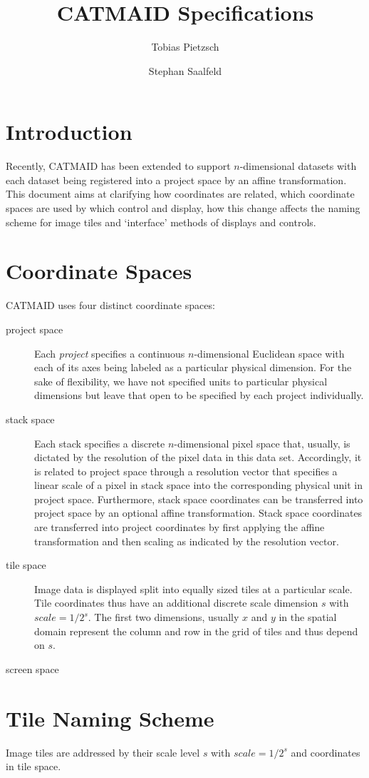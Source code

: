 \documentclass[a4paper,10pt]{article}
\title{CATMAID Specifications}
\author{Tobias Pietzsch \and Stephan Saalfeld}
\begin{document}
\maketitle


\section{Introduction}

Recently, CATMAID has been extended to support $n$-dimensional datasets with each dataset being registered into a project space by an affine transformation.  This document aims at clarifying how coordinates are related, which coordinate spaces are used by which control and display, how this change affects the naming scheme for image tiles and `interface' methods of displays and controls.


\section{Coordinate Spaces}

CATMAID uses four distinct coordinate spaces:

\begin{description}
\item[project space]{Each \emph{project} specifies a continuous $n$-dimensional Euclidean space with each of its axes being labeled as a particular physical dimension.  For the sake of flexibility, we have not specified units to particular physical dimensions but leave that open to be specified by each project individually.}
\item[stack space]{Each stack specifies a discrete $n$-dimensional pixel space that, usually, is dictated by the resolution of the pixel data in this data set.  Accordingly, it is related to project space through a resolution vector that specifies a linear scale of a pixel in stack space into the corresponding physical unit in project space.  Furthermore, stack space coordinates can be transferred into project space by an optional affine transformation.  Stack space coordinates are transferred into project coordinates by first applying the affine transformation and then scaling as indicated by the resolution vector.}
\item[tile space]{Image data is displayed split into equally sized tiles at a particular scale.  Tile coordinates thus have an additional discrete scale dimension $s$ with $scale = 1/2^s$.  The first two dimensions, usually $x$ and $y$ in the spatial domain represent the column and row in the grid of tiles and thus depend on $s$.}
\item[screen space]{}
\end{description}


\section{Tile Naming Scheme}

Image tiles are addressed by their scale level $s$ with $scale = 1/2^s$ and coordinates in tile space.
\end{document}

